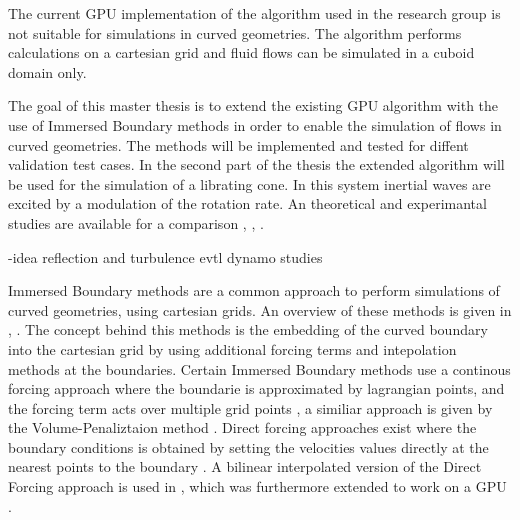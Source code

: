 The current GPU implementation of the algorithm used in the research group is not suitable
for simulations in curved geometries.
The algorithm performs calculations on a cartesian grid and fluid flows can be simulated in a cuboid domain only.

The goal of this master thesis is to extend the existing GPU algorithm with the use of Immersed Boundary methods
in order to enable the simulation of flows in curved  geometries.
The methods will be implemented and tested for diffent validation test cases.
In the second part of the thesis the extended algorithm will be used for the simulation of a librating cone.
In this system inertial waves are excited by a modulation of the rotation rate.
An theoretical and experimantal studies are available for a comparison \citep{Sauret2012}, \citep{Beardsley1970}, \citep{Greenspan1969}.

-idea reflection and turbulence evtl dynamo studies


Immersed Boundary methods are a common approach to perform simulations of curved geometries, using cartesian grids.
An overview of these methods is given in \citep{Mittal2005}, \citep{Gornak2013}.
The concept behind this methods is the embedding of the curved boundary into the cartesian grid
by using additional forcing terms and intepolation methods at the boundaries.
Certain Immersed Boundary methods use a continous forcing approach where the boundarie is approximated by lagrangian points,
and the forcing term acts over multiple grid points \citep{Mittal2005}, a
similiar approach is given by the Volume-Penaliztaion method \citep{Lulff2011}.
Direct forcing approaches exist where the boundary conditions is obtained by setting the
velocities values directly at the nearest points to the boundary \citep{Fadlun2000}.
A bilinear interpolated version of the Direct Forcing approach is used in \citep{Gornak2013},
which was furthermore extended to work on a GPU \citep{DeLeon2012}.



\bigbreak

